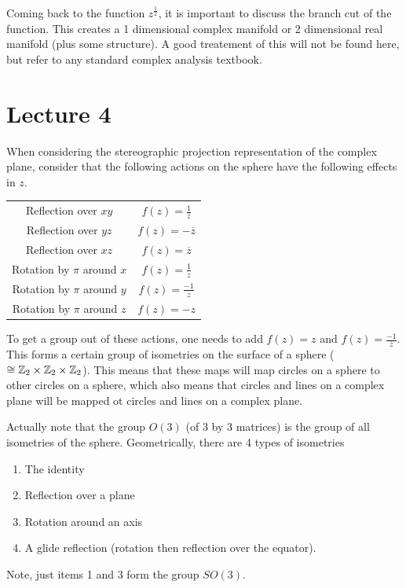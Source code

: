 \documentclass[11pt,leqno,oneside]{amsart}
\begin{document}
Coming back to the function $z^{\frac{1}{2}}$, it is important to discuss the
branch cut of the function. This creates a 1 dimensional complex manifold or
2 dimensional real manifold (plus some structure). A good treatement of this
will not be found here, but refer to any standard complex analysis textbook.

\section{Lecture 4}
When considering the stereographic projection representation of the complex
plane, consider that the following actions on the sphere have the following
effects in $z$.

\begin{tabular}{|c|c|}
    \hline
    Reflection over $xy$ & $f(z) = \frac{1}{\overline{z}}$ \\
    Reflection over $yz$ & $f(z) = -\overline{z}$ \\
    Reflection over $xz$ & $f(z) = \overline{z}$ \\
    Rotation by $\pi$ around $x$ & $f(z) = \frac{1}{z}$ \\
    Rotation by $\pi$ around $y$ & $f(z) = \frac{-1}{z}$ \\
    Rotation by $\pi$ around $z$ & $f(z) = -z$ \\
    \hline
\end{tabular}

To get a group out of these actions, one needs to add $f(z) = z$ and $f(z) =
\frac{-1}{\overline{z}}$. This forms a certain group of isometries on the
surface of a sphere ($\cong {\mathbb Z}_2 \times {\mathbb Z}_2 \times {\mathbb Z}_2$). This means that
these maps will map circles on a sphere to other circles on a sphere, which
also means that circles and lines on a complex plane will be mapped ot circles
and lines on a complex plane.

Actually note that the group $O(3)$ (of 3 by 3 matrices) is the group of all
isometries of the sphere. Geometrically, there are 4 types of isometries
\begin{enumerate}
    \item The identity
    \item Reflection over a plane
    \item Rotation around an axis
    \item A glide reflection (rotation then reflection over the equator).
\end{enumerate}
Note, just items 1 and 3 form the group $SO(3)$.
\end{document}
